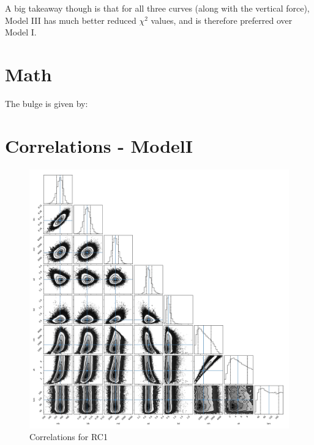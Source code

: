 \documentclass[fleqn,usenatbib]{mnras}
\begin{document}
A big takeaway though is that for all three curves (along with the vertical force), Model III has much better reduced $\chi^2$ values, and is therefore preferred over Model I.







\appendix
\section{Math}

The bulge is given by:

\section{Correlations - ModelI}

\begin{figure}
\includegraphics[width=\columnwidth]{Model_I/Plots/Sofue(2009)/emcee_corner_10000_100.pdf}
\caption{Correlations for RC1
}
\label{fig:Model1_Sofue2009}
\end{figure}
\end{document}
